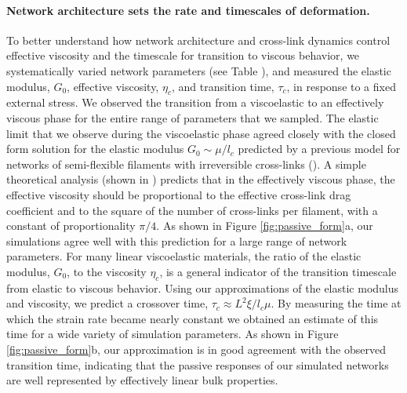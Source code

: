 \documentclass[10pt,letterpaper]{article}
\begin{document}
\paragraph{Network architecture sets the rate and timescales of deformation.}  To better understand how network architecture and cross-link dynamics control effective viscosity and the timescale for transition to viscous behavior, we systematically varied network parameters (see Table ), and measured the elastic modulus, $G_0$, effective viscosity, $\eta_c$, and transition time, $\tau_c$, in response to a fixed external stress. We observed the transition from a viscoelastic to an effectively viscous phase for the entire range of parameters that we sampled.  The elastic limit that we observe during the viscoelastic phase agreed closely with the closed form solution for the elastic modulus  $G_0 \sim \mu/l_c$ predicted by a previous model \cite{theo_hlm} for networks of semi-flexible filaments with irreversible cross-links (). A simple theoretical analysis (shown in ) predicts that in the effectively viscous phase, the effective viscosity should be proportional to the effective cross-link drag coefficient and to the square of the number of cross-links per filament, with a constant of proportionality $\pi/4$. As shown in Figure \ref{fig:passive_form}a, our simulations agree well with this prediction for a large range of network parameters. For many linear viscoelastic materials, the ratio of the elastic modulus, $G_0$, to the viscosity $\eta_c$, is a general indicator of the transition timescale from elastic to viscous behavior\cite{mccrum1997principles}. Using our approximations of the elastic modulus and viscosity, we predict a crossover time, $\tau_c \approx L^2\xi/l_c\mu$. By measuring the time at which the strain rate became nearly constant we obtained an estimate of this time for a wide variety of simulation parameters. As shown in Figure \ref{fig:passive_form}b, our approximation is in good agreement with the observed transition time, indicating that the passive responses of our simulated networks are well represented by effectively linear bulk properties.
\end{document}
